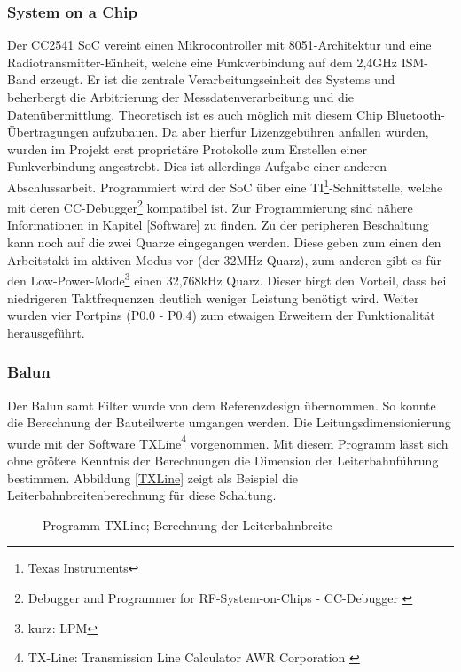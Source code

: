 \documentclass[12pt]{scrreprt} %
\begin{document}
\subsubsection{System on a Chip}
Der CC2541 SoC vereint einen Mikrocontroller mit 8051-Architektur und eine Radiotransmitter-Einheit, welche eine Funkverbindung auf dem 2,4GHz ISM-Band erzeugt. Er ist die zentrale Verarbeitungseinheit des Systems und beherbergt die Arbitrierung der Messdatenverarbeitung und die Datenübermittlung.  Theoretisch ist es auch möglich mit diesem Chip Bluetooth-Übertragungen aufzubauen. Da aber hierfür Lizenzgebühren anfallen würden, wurden im Projekt erst proprietäre Protokolle zum Erstellen einer Funkverbindung angestrebt. Dies ist allerdings Aufgabe einer anderen Abschlussarbeit. Programmiert wird der SoC über eine TI\footnote{Texas Instruments}-Schnittstelle, welche mit deren CC-Debugger\footnote{Debugger and Programmer for RF-System-on-Chips - CC-Debugger \citep{CCDEBUG}} kompatibel ist. Zur Programmierung sind nähere Informationen in Kapitel \vref{Software} zu finden. Zu der peripheren Beschaltung kann noch auf die zwei Quarze eingegangen werden. Diese geben zum einen den Arbeitstakt im aktiven Modus vor (der 32MHz Quarz), zum anderen gibt es für den Low-Power-Mode\footnote{kurz: LPM} einen 32,768kHz Quarz. Dieser birgt den Vorteil, dass bei niedrigeren Taktfrequenzen deutlich weniger Leistung benötigt wird. Weiter wurden vier Portpins (P0.0 - P0.4) zum etwaigen Erweitern der Funktionalität herausgeführt. 
\subsubsection{Balun}
Der Balun samt Filter wurde von dem Referenzdesign übernommen. So konnte die Berechnung der Bauteilwerte umgangen werden. Die Leitungsdimensionierung wurde mit der Software TXLine\footnote{TX-Line: Transmission Line Calculator AWR Corporation \citep{TXLINE}} vorgenommen. Mit diesem Programm lässt sich ohne größere Kenntnis der Berechnungen die Dimension der Leiterbahnführung bestimmen. Abbildung \vref{TXLine} zeigt als Beispiel die Leiterbahnbreitenberechnung für diese Schaltung.
\begin{figure}
\centering
{}
\caption{Programm TXLine; Berechnung der Leiterbahnbreite}
\label{TXLine}
\end{figure}
\end{document}
